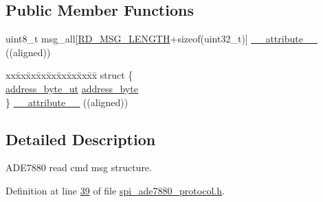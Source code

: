 \subsection*{Public Member Functions}
\begin{DoxyCompactItemize}
\item 
uint8\-\_\-t msg\-\_\-all\mbox{[}\hyperlink{a00041_a0f0795755fb9e8e47c78c1289e091282}{R\-D\-\_\-\-M\-S\-G\-\_\-\-L\-E\-N\-G\-T\-H}+sizeof(uint32\-\_\-t)\mbox{]} \hyperlink{a00014_a0375c167ecb7ad99bf0fea17ee3a3e7f}{\-\_\-\-\_\-attribute\-\_\-\-\_\-} ((aligned))
\item 
\begin{tabbing}
xx\=xx\=xx\=xx\=xx\=xx\=xx\=xx\=xx\=\kill
struct \{\\
\>\hyperlink{a00011}{address\_byte\_ut} \hyperlink{a00014_af6a65bac733ea3e9b1d24b065163d49a}{address\_byte}\\
\} \hyperlink{a00014_a5cf57133ad861d48e9aae1596342ef62}{\_\_attribute\_\_} ((aligned))\\

\end{tabbing}\end{DoxyCompactItemize}


\subsection{Detailed Description}
A\-D\-E7880 read cmd msg structure. 

Definition at line \hyperlink{a00041_source_l00039}{39} of file \hyperlink{a00041_source}{spi\-\_\-ade7880\-\_\-protocol.\-h}.



